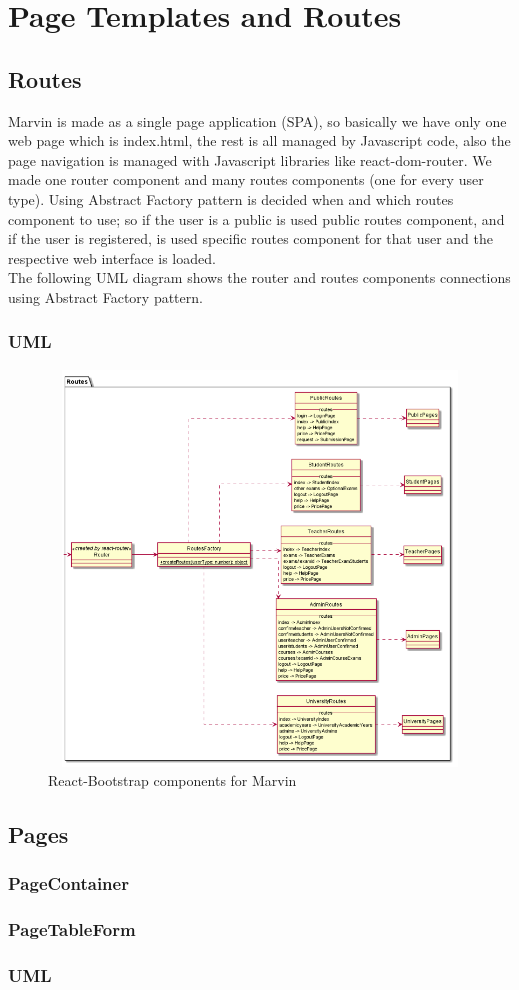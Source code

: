 \documentclass[../react.tex]{subfiles}
\begin{document}
	
	\section{Page Templates and Routes}

	\subsection{Routes}Marvin is made as a single page application (SPA), so basically we have only one web page which is index.html, the rest is all managed by Javascript code, also the page navigation is managed with Javascript libraries like react-dom-router. We made one router component and many routes components (one for every user type). Using Abstract Factory pattern is decided when and which routes component to use; so if the user is a public is used public routes component, and if the user is registered, is used specific routes component for that user and the respective web interface is loaded. \\
	The following UML diagram shows the router and routes components connections using Abstract Factory pattern.
		\subsubsection{UML}
			\begin{figure}[h]
			\centering
			\includegraphics[width=13cm,height=10.5cm]{"diagrammi/react/routes"}
			\caption{React-Bootstrap components for Marvin}
			\label{fig:React-Bootstrap components for Marvin}
		\end{figure}
		\newpage
	\subsection{Pages}
	

	\subsubsection{PageContainer}
	
	\subsubsection{PageTableForm}
	
	\subsubsection{UML}
	
\end{document}
